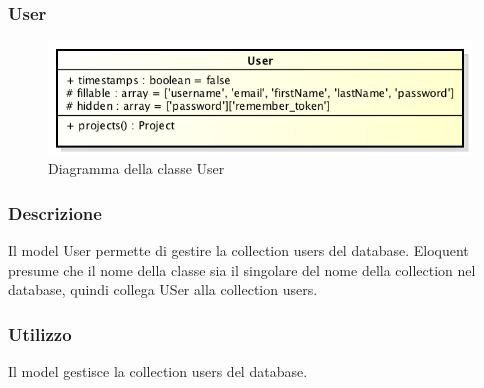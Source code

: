 \newpage
\subsubsection{User}

	\begin{figure}[h]
		\centering
		\includegraphics[width=0.7\linewidth]{img/User}
		\caption[Diagramma della classe User]{Diagramma della classe User}
		\label{fig:User}
	\end{figure}

	\subsubsection*{Descrizione}
	Il model User permette di gestire la collection users del database. Eloquent presume che il nome della classe sia il singolare del nome della collection nel database, quindi collega USer alla collection users.
	\subsubsection*{Utilizzo}
	Il model gestisce la collection users del database.
